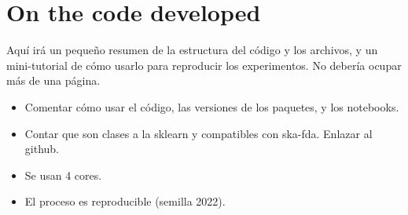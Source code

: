 %
%

\chapter{On the code developed}\label{ch:code}

\begin{outcomment}
  Aquí irá un pequeño resumen de la estructura del código y los archivos, y un mini-tutorial de cómo usarlo para reproducir los experimentos. No debería ocupar más de una página.

  \begin{itemize}
    \item  Comentar cómo usar el código, las versiones de los paquetes, y los notebooks.
    \item Contar que son clases a la sklearn y compatibles con ska-fda. Enlazar al github.
    \item Se usan 4 cores.
    \item El proceso es reproducible (semilla 2022).
  \end{itemize}
\end{outcomment}
